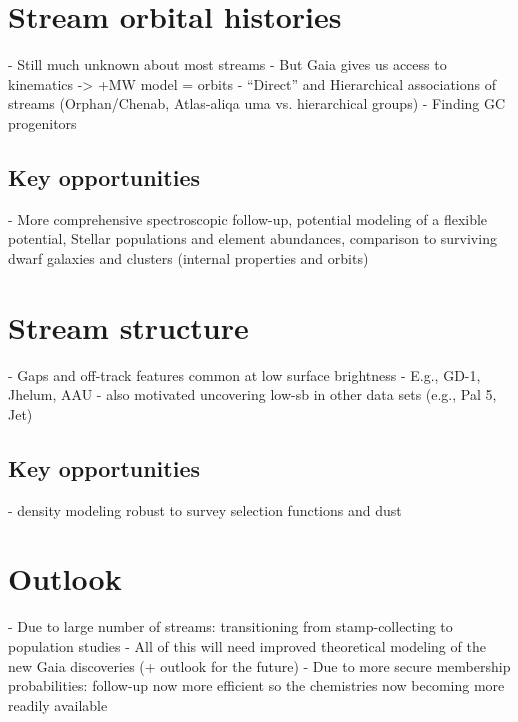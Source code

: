 \documentclass[authoryear]{elsarticle}
\begin{document}
\section{Stream orbital histories}
\label{sec:orbits}
- Still much unknown about most streams
- But Gaia gives us access to kinematics -> +MW model = orbits
- “Direct” and Hierarchical associations of streams (Orphan/Chenab, Atlas-aliqa uma vs. hierarchical groups)
- Finding GC progenitors

\subsection{Key opportunities}
- More comprehensive spectroscopic follow-up, potential modeling of a flexible potential, Stellar populations and element abundances, comparison to surviving dwarf galaxies and clusters (internal properties and orbits)


\section{Stream structure}
\label{sec:structure}
- Gaps and off-track features common at low surface brightness
- E.g., GD-1, Jhelum, AAU
- also motivated uncovering low-sb in other data sets (e.g., Pal 5, Jet)

\subsection{Key opportunities}
- density modeling robust to survey selection functions and dust


\section{Outlook}
\label{sec:outlook}
- Due to large number of streams: transitioning from stamp-collecting to population studies
- All of this will need improved theoretical modeling of the new Gaia discoveries (+ outlook for the future)
- Due to more secure membership probabilities: follow-up now more efficient so the chemistries now becoming more readily available





 
 
\end{document}

